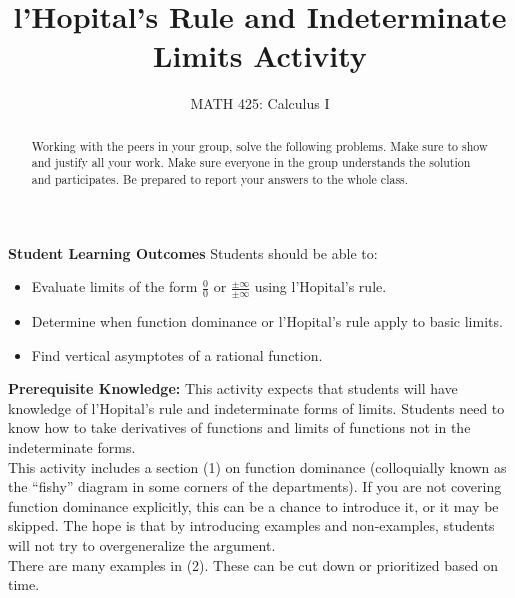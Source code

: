 \documentclass{ximera}
\title{l'Hopital's Rule and Indeterminate Limits Activity}
\author{MATH 425: Calculus I}
\begin{document}
\begin{abstract}
   Working with the peers in your group, solve the following problems. Make sure to show and justify all your work. Make sure everyone in the group understands the solution and participates. Be prepared to report your answers to the whole class. 
\end{abstract}
\maketitle

\textbf{Student Learning Outcomes}
Students should be able to:
    \begin{itemize}
        \item Evaluate limits of the form $\frac00$ or $\frac{\pm\infty}{\pm\infty}$ using l'Hopital's rule.
        \item Determine when function dominance or l'Hopital's rule apply to basic limits.
        \item Find vertical asymptotes of a rational function.
    \end{itemize}

\textbf{Prerequisite Knowledge:} This activity expects that students will have knowledge of l'Hopital's rule and indeterminate forms of limits.  Students need to know how to take derivatives of functions and limits of functions not in the indeterminate forms. \\

This activity includes a section (1) on function dominance (colloquially known as the ``fishy'' diagram in some corners of the departments).  If you are not covering function dominance explicitly, this can be a chance to introduce it, or it may be skipped.  The hope is that by introducing examples and non-examples, students will not try to overgeneralize the argument. \\

There are many examples in (2). These can be cut down or prioritized based on time.
\end{document}
